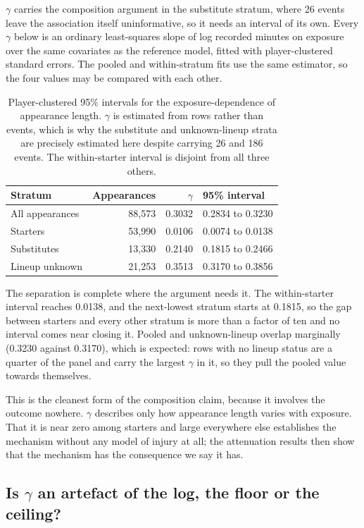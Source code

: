 \documentclass[11pt]{article}
\begin{document}
$\gamma$ carries the composition argument in the substitute stratum, where 26 events leave the association itself uninformative, so it needs an interval of its own. Every $\gamma$ below is an ordinary least-squares slope of log recorded minutes on exposure over the same covariates as the reference model, fitted with player-clustered standard errors. The pooled and within-stratum fits use the same estimator, so the four values may be compared with each other.

\begin{table}[h]
\centering
\caption{Player-clustered 95\% intervals for the exposure-dependence of appearance length. $\gamma$ is estimated from rows rather than events, which is why the substitute and unknown-lineup strata are precisely estimated here despite carrying 26 and 186 events. The within-starter interval is disjoint from all three others.}
\label{tab:supp_gamma}
\small
\begin{tabular}{lrrl}
\toprule
Stratum & Appearances & $\gamma$ & 95\% interval\\
\midrule
All appearances & 88,573 & 0.3032 & 0.2834 to 0.3230\\
Starters & 53,990 & 0.0106 & 0.0074 to 0.0138\\
Substitutes & 13,330 & 0.2140 & 0.1815 to 0.2466\\
Lineup unknown & 21,253 & 0.3513 & 0.3170 to 0.3856\\
\bottomrule
\end{tabular}
\end{table}

The separation is complete where the argument needs it. The within-starter interval reaches 0.0138, and the next-lowest stratum starts at 0.1815, so the gap between starters and every other stratum is more than a factor of ten and no interval comes near closing it. Pooled and unknown-lineup overlap marginally (0.3230 against 0.3170), which is expected: rows with no lineup status are a quarter of the panel and carry the largest $\gamma$ in it, so they pull the pooled value towards themselves.

This is the cleanest form of the composition claim, because it involves the outcome nowhere. $\gamma$ describes only how appearance length varies with exposure. That it is near zero among starters and large everywhere else establishes the mechanism without any model of injury at all; the attenuation results then show that the mechanism has the consequence we say it has.

\subsection*{Is $\gamma$ an artefact of the log, the floor or the ceiling?}
\end{document}

